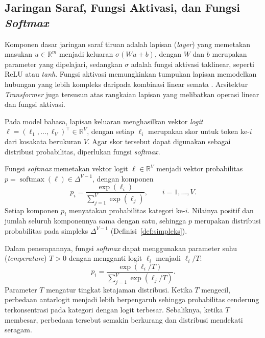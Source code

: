 \subsection{Jaringan Saraf, Fungsi Aktivasi, dan Fungsi \textit{Softmax}}
\label{subsec:softmax}

Komponen dasar jaringan saraf tiruan adalah lapisan (\textit{layer})
yang memetakan masukan $u\in\mathbb{R}^{m}$ menjadi keluaran
$\sigma(Wu+b)$, dengan $W$ dan $b$ merupakan parameter yang
dipelajari, sedangkan $\sigma$ adalah fungsi aktivasi taklinear,
seperti ReLU atau \textit{tanh}. Fungsi aktivasi memungkinkan
tumpukan lapisan memodelkan hubungan yang lebih kompleks daripada
kombinasi linear semata \citep{goodfellow}. Arsitektur
\textit{Transformer} juga tersusun atas rangkaian lapisan yang
melibatkan operasi linear dan fungsi aktivasi.

Pada model bahasa, lapisan keluaran menghasilkan vektor
\textit{logit} $\ell=(\ell_1,\ldots,\ell_V)^\top\in\mathbb{R}^V$,
dengan setiap $\ell_i$ merupakan skor untuk token ke-$i$ dari
kosakata berukuran $V$. Agar skor tersebut dapat digunakan sebagai
distribusi probabilitas, diperlukan fungsi \textit{softmax}.

\begin{definisi}
\label{def:softmax}
Fungsi \textit{softmax} memetakan vektor logit
$\ell\in\mathbb{R}^V$ menjadi vektor probabilitas
$p=\operatorname{softmax}(\ell)\in\Delta^{V-1}$, dengan komponen
\begin{equation}
p_i=\frac{\exp(\ell_i)}
{\sum_{j=1}^{V}\exp(\ell_j)},
\qquad i=1,\ldots,V.
\label{eq:softmax}
\end{equation}
Setiap komponen $p_i$ menyatakan probabilitas kategori ke-$i$.
Nilainya positif dan jumlah seluruh komponennya sama dengan satu,
sehingga $p$ merupakan distribusi probabilitas pada simpleks
$\Delta^{V-1}$ (Definisi~\ref{def:simpleks}).
\end{definisi}

Dalam penerapannya, fungsi \textit{softmax} dapat menggunakan
parameter suhu (\textit{temperature}) $T>0$ dengan mengganti logit
$\ell_i$ menjadi $\ell_i/T$:
\begin{equation}
p_i=\frac{\exp(\ell_i/T)}
{\sum_{j=1}^{V}\exp(\ell_j/T)}.
\label{eq:softmax-temperature}
\end{equation}
Parameter $T$ mengatur tingkat ketajaman distribusi. Ketika
$T$ mengecil, perbedaan antarlogit menjadi lebih berpengaruh
sehingga probabilitas cenderung terkonsentrasi pada kategori
dengan logit terbesar. Sebaliknya, ketika $T$ membesar, perbedaan
tersebut semakin berkurang dan distribusi mendekati seragam.

